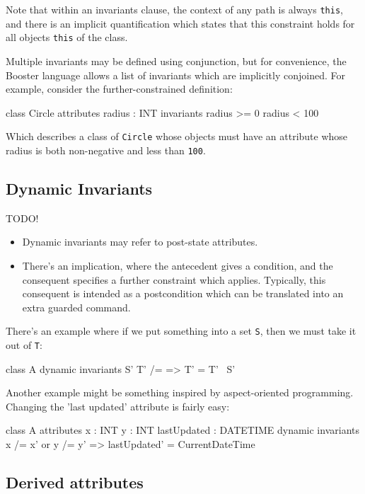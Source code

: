 Note that within an invariants clause, the context of any path is
always \verb|this|, and there is an implicit quantification which
states that this constraint holds for all objects \verb|this| of the
class.

Multiple invariants may be defined using conjunction, but for
convenience, the Booster language allows a list of invariants which
are implicitly conjoined.  For example, consider the
further-constrained definition:

\begin{code}
class Circle {
  attributes
    radius : INT
  invariants
    radius >= 0
    radius < 100
}
\end{code}

Which describes a class of \verb|Circle| whose objects must have an
attribute whose radius is both non-negative and less than \verb|100|.

\subsection{Dynamic Invariants}

TODO!

\begin{itemize}
\item Dynamic invariants may refer to post-state attributes.
\item There's an implication, where the antecedent gives a condition,
  and the consequent specifies a further constraint which applies.
  Typically, this consequent is intended as a postcondition which can
  be translated into an extra guarded command.
\end{itemize}

There's an example where if we put something into a set \verb|S|, then
we must take it out of \verb|T|:
\begin{code}
class A
  dynamic invariants
    S' \/ T' /= {} => T' = T' \ S'
\end{code}

Another example might be something inspired by aspect-oriented
programming.  Changing the 'last updated' attribute is fairly easy:

\begin{code}
class A {
  attributes
    x : INT
    y : INT
    lastUpdated : DATETIME
  dynamic invariants
    x /= x' or y /= y' => lastUpdated' = CurrentDateTime
}
\end{code}

  
\subsection{Derived attributes}

